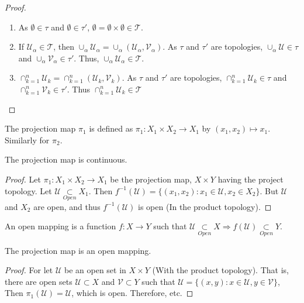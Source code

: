 \documentclass[crop=false,class=book]{standalone}
\begin{document}
\begin{proof}
\
\begin{enumerate}
\item As $\emptyset \in \tau$ and $\emptyset\in \tau'$, $\emptyset =\emptyset\times \emptyset \in \mathscr{T}$.
\item If $\mathscr{U}_{\alpha}\in \mathscr{T}$, then $\cup_{\alpha} \mathscr{U}_{\alpha} = \cup_{\alpha} (\mathcal{U}_{\alpha},\mathcal{V}_{\alpha})$. As $\tau$ and $\tau'$ are topologies, $\cup_{\alpha} \mathcal{U} \in \tau$ and $\cup_{\alpha}\mathcal{V}_{\alpha} \in \tau'$. Thus, $\cup_{\alpha}\mathscr{U}_{\alpha} \in \mathscr{T}$.
\item $\cap_{k=1}^{n} \mathscr{U}_{k} = \cap_{k=1}^{n} (\mathcal{U}_k,\mathcal{V}_k)$. As $\tau$ and $\tau'$ are topologies, $\cap_{k=1}^{n}\mathcal{U}_k \in \tau$ and $\cap_{k=1}^{n}\mathcal{V}_{k} \in \tau'$. Thus $\cap_{k=1}^{n} \mathscr{U}_k \in \mathscr{T}$
\end{enumerate}
\end{proof}
\begin{definition}
The projection map $\pi_1$ is defined as $\pi_1:X_1\times X_2\rightarrow X_1$ by $(x_1,x_2)\mapsto x_1$. Similarly for $\pi_2$.
\end{definition}
\begin{theorem}
The projection map is continuous.
\end{theorem}
\begin{proof}
Let $\pi_1:X_1\times X_2\rightarrow X_1$ be the projection map, $X\times Y$ having the project topology. Let $\mathcal{U}\underset{Open}\subset X_1$. Then $f^{-1}(\mathcal{U}) = \{(x_1,x_2):x_1\in \mathcal{U}, x_2\in X_2\}$. But $\mathcal{U}$ and $X_2$ are open, and thus $f^{-1}(\mathcal{U})$ is open (In the product topology).
\end{proof}
\begin{definition}
An open mapping is a function $f:X\rightarrow Y$ such that $\mathcal{U}\underset{Open}\subset X\Rightarrow f(\mathcal{U}) \underset{Open}\subset Y$.
\end{definition}
\begin{theorem}
The projection map is an open mapping.
\end{theorem}
\begin{proof}
For let $\mathscr{U}$ be an open set in $X\times Y$ (With the product topology). That is, there are open sets $\mathcal{U}\subset X$ and $\mathcal{V}\subset Y$ such that $\mathscr{U}= \{(x,y):x\in \mathcal{U},y\in \mathcal{V}\}$, Then $\pi_1(\mathscr{U}) =\mathcal{U}$, which is open. Therefore, etc.
\end{proof}
\end{document}
